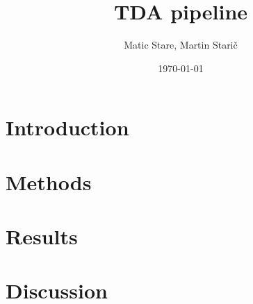 \documentclass{article}
\title{TDA pipeline}
\author{Matic Stare, Martin Starič}
\date{\today}
\begin{document}
\maketitle

\tableofcontents
\newpage

\section{Introduction}
\section{Methods}
\section{Results}
\section{Discussion}
\end{document}
